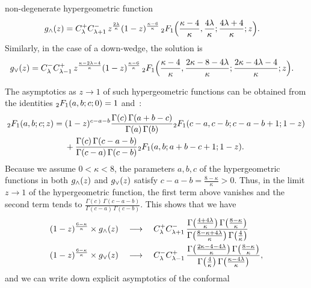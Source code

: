 \documentclass[oneside,english]{amsart}
\numberwithin{equation}{section}
\numberwithin{figure}{section}
\theoremstyle{plain}
\theoremstyle{plain}
\theoremstyle{plain}
\theoremstyle{remark}
\theoremstyle{plain}
\theoremstyle{plain}
\theoremstyle{plain}
\theoremstyle{plain}
\theoremstyle{plain}
\theoremstyle{plain}
\theoremstyle{plain}
\theoremstyle{plain}
\newcommand{\blue}[1]{{\color{blue} #1}}
\begin{document}
non-degenerate hypergeometric function
\begin{align*}
g_{\wedge}(z)=\; & C_{\lambda}^{+}C_{\lambda+1}^{-}\,z^{\frac{2\lambda}{\kappa}}(1-z)^{\frac{\kappa-6}{\kappa}}\,{{}_2 F_1}\Big(\frac{\kappa-4}{\kappa},\frac{4\lambda}{\kappa};\frac{4\lambda+4}{\kappa};z\Big).
\end{align*}
Similarly, in the case of a down-wedge, 
the solution is
\begin{align*}
g_{\vee}(z)=\; & C_{\lambda}^{-}C_{\lambda-1}^{+}\,z^{\frac{\kappa-2\lambda-4}{\kappa}}(1-z)^{\frac{\kappa-6}{\kappa}}\,{{}_2 F_1}\Big(\frac{\kappa-4}{\kappa},\frac{2\kappa-8-4\lambda}{\kappa};\frac{2\kappa-4\lambda-4}{\kappa};z\Big).
\end{align*}

The asymptotics as $z\to1$ of such hypergeometric functions can be
obtained from the identities
${{}_2 F_1}(a,b;c;0)=1$ and~\cite[Equation~(15.3.6)]{AS-handbook}:
\begin{align*}
{{}_2 F_1}(a,b;c;z)=\; & (1-z)^{c-a-b}\frac{\Gamma(c)\,\Gamma(a+b-c)}{\Gamma(a)\,\Gamma(b)}{{}_2 F_1}(c-a,c-b;c-a-b+1;1-z)\\
 & +\frac{\Gamma(c)\,\Gamma(c-a-b)}{\Gamma(c-a)\,\Gamma(c-b)}{{}_2 F_1}(a,b;a+b-c+1;1-z) .
\end{align*}
Because we assume $0<\kappa<8$, the parameters $a,b,c$
of the hypergeometric functions in both $g_{\wedge}(z)$ and $g_{\vee}(z)$
satisfy $c-a-b=\frac{8-\kappa}{\kappa}>0$. Thus, in the limit $z\to1$
of the hypergeometric function, the first term above vanishes and the second
term tends to $\frac{\Gamma(c)\,\Gamma(c-a-b)}{\Gamma(c-a)\,\Gamma(c-b)}$.
This shows that we have
\begin{align*}
(1-z)^{\frac{6-\kappa}{\kappa}}\times g_{\wedge}(z)\quad \longrightarrow \quad\; & C_{\lambda}^{+}C_{\lambda+1}^{-}\,\frac{\Gamma\big(\frac{4+4\lambda}{\kappa}\big)\,\Gamma\big(\frac{8-\kappa}{\kappa}\big)}{\Gamma\big(\frac{8-\kappa+4\lambda}{\kappa}\big)\,\Gamma\big(\frac{4}{\kappa}\big)}\\
(1-z)^{\frac{6-\kappa}{\kappa}}\times g_{\vee}(z)\quad \longrightarrow \quad\; & C_{\lambda}^{-}C_{\lambda-1}^{+}\,\frac{\Gamma\big(\frac{2\kappa-4-4\lambda}{\kappa}\big)\,\Gamma\big(\frac{8-\kappa}{\kappa}\big)}{\Gamma\big(\frac{4}{\kappa}\big)\,\Gamma\big(\frac{\kappa-4\lambda}{\kappa}\big)},
\end{align*}
and we can write down explicit asymptotics of the conformal
\end{document}
